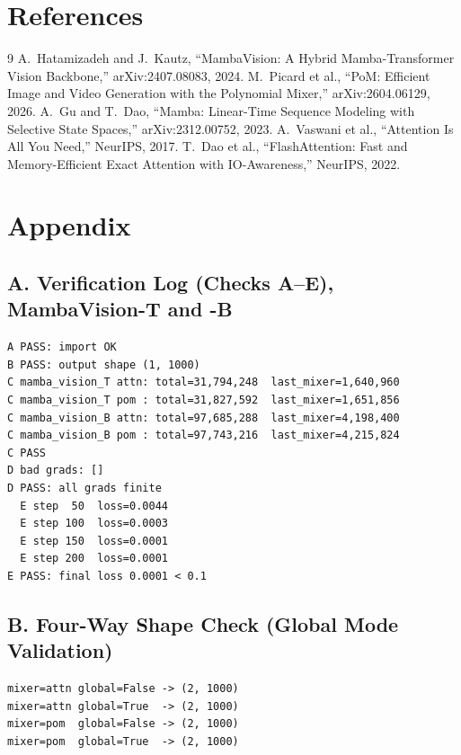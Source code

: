 \documentclass[11pt,a4paper]{article}
\begin{document}
\section*{References}

\begin{thebibliography}{9}
 A.~Hatamizadeh and J.~Kautz, ``MambaVision: A Hybrid Mamba-Transformer Vision Backbone,'' arXiv:2407.08083, 2024.
 M.~Picard et al., ``PoM: Efficient Image and Video Generation with the Polynomial Mixer,'' arXiv:2604.06129, 2026.
 A.~Gu and T.~Dao, ``Mamba: Linear-Time Sequence Modeling with Selective State Spaces,'' arXiv:2312.00752, 2023.
 A.~Vaswani et al., ``Attention Is All You Need,'' NeurIPS, 2017.
 T.~Dao et al., ``FlashAttention: Fast and Memory-Efficient Exact Attention with IO-Awareness,'' NeurIPS, 2022.
\end{thebibliography}

\newpage
\section*{Appendix}

\subsection*{A. Verification Log (Checks A--E), MambaVision-T and -B}
\begin{lstlisting}[basicstyle=\ttfamily\scriptsize]
A PASS: import OK
B PASS: output shape (1, 1000)
C mamba_vision_T attn: total=31,794,248  last_mixer=1,640,960
C mamba_vision_T pom : total=31,827,592  last_mixer=1,651,856
C mamba_vision_B attn: total=97,685,288  last_mixer=4,198,400
C mamba_vision_B pom : total=97,743,216  last_mixer=4,215,824
C PASS
D bad grads: []
D PASS: all grads finite
  E step  50  loss=0.0044
  E step 100  loss=0.0003
  E step 150  loss=0.0001
  E step 200  loss=0.0001
E PASS: final loss 0.0001 < 0.1
\end{lstlisting}

\subsection*{B. Four-Way Shape Check (Global Mode Validation)}
\begin{lstlisting}[basicstyle=\ttfamily\scriptsize]
mixer=attn global=False -> (2, 1000)
mixer=attn global=True  -> (2, 1000)
mixer=pom  global=False -> (2, 1000)
mixer=pom  global=True  -> (2, 1000)
\end{lstlisting}
\end{document}
